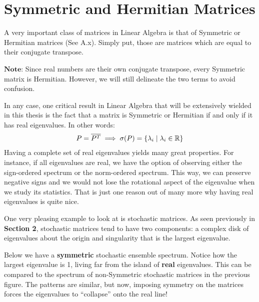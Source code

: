 \newpage
\section{Symmetric and Hermitian Matrices}

A very important class of matrices in Linear Algebra is that of Symmetric or Hermitian matrices (See A.x). Simply put, those are matrices which are equal to their conjugate transpose.

$\textbf{Note:}$ Since real numbers are their own conjugate transpose, every Symmetric matrix is Hermitian. However, we will still delineate the two terms to avoid confusion.

In any case, one critical result in Linear Algebra that will be extensively wielded in this thesis is the fact that a matrix is Symmetric or Hermitian if and only if it has real eigenvalues. In other words:
\begin{align*}
P = \overline{P^{T}} \implies \sigma(P) = \{\lambda_i \mid \lambda_i \in \mathbb{R}\}
\end{align*}
Having a complete set of real eigenvalues yields many great properties. For instance, if all eigenvalues are real, we have the option of observing either the sign-ordered spectrum or the norm-ordered spectrum. This way, we can preserve negative signs and we would not lose the rotational aspect of the eigenvalue when we study its statistics. That is just one reason out of many more why having real eigenvalues is quite nice.


One very pleasing example to look at is stochastic matrices. As seen previously in \textbf{Section 2}, stochastic matrices tend to have two components: a complex disk of eigenvalues about the origin and singularity that is the largest eigenvalue.

Below we have a \textbf{symmetric} stochastic ensemble spectrum. Notice how the largest eigenvalue is 1, living far from the island of \textbf{real} eigenvalues. This can be compared to the spectrum of non-Symmetric stochastic matrices in the previous figure. The patterns are similar, but now, imposing symmetry on the matrices forces the eigenvalues to ``collapse'' onto the real line!

